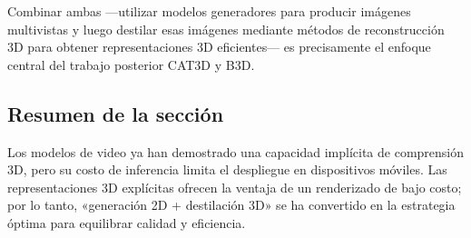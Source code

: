 Combinar ambas —utilizar modelos generadores para producir imágenes multivistas y luego destilar esas imágenes mediante métodos de reconstrucción 3D para obtener representaciones 3D eficientes— es precisamente el enfoque central del trabajo posterior CAT3D y B3D.

\subsection{Resumen de la sección}

Los modelos de video ya han demostrado una capacidad implícita de comprensión 3D, pero su costo de inferencia limita el despliegue en dispositivos móviles. Las representaciones 3D explícitas ofrecen la ventaja de un renderizado de bajo costo; por lo tanto, «generación 2D + destilación 3D» se ha convertido en la estrategia óptima para equilibrar calidad y eficiencia.
